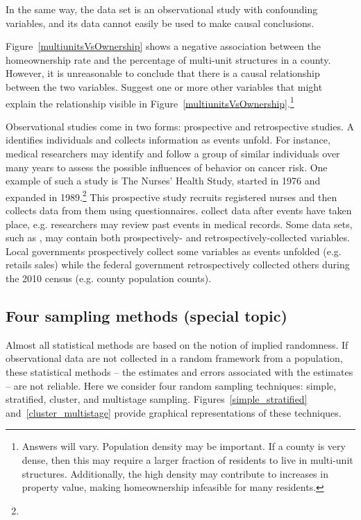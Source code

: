 In the same way, the  data set is an observational study with confounding variables, and its data cannot easily be used to make causal conclusions.

\begin{exercise}
Figure~\ref{multiunitsVsOwnership} shows a negative association between the homeownership rate and the percentage of multi-unit structures in a county. However, it is unreasonable to conclude that there is a causal relationship between the two variables. Suggest one or more other variables that might explain the relationship visible in Figure~\ref{multiunitsVsOwnership}.\footnote{Answers will vary. Population density may be important. If a county is very dense, then this may require a larger fraction of residents to live in multi-unit structures. Additionally, the high density may contribute to increases in property value, making homeownership infeasible for many residents.}
\end{exercise}

Observational studies come in two forms: prospective and retrospective studies. A  identifies individuals and collects information as events unfold. For instance, medical researchers may identify and follow a group of similar individuals over many years to assess the possible influences of behavior on cancer risk. One example of such a study is The Nurses' Health Study, started in 1976 and expanded in 1989.\footnote{} This prospective study recruits registered nurses and then collects data from them using questionnaires.  collect data after events have taken place, e.g. researchers may review past events in medical records. Some data sets, such as , may contain both prospectively- and retrospectively-collected variables. Local governments prospectively collect some variables as events unfolded (e.g. retails sales) while the federal government retrospectively collected others during the 2010 census (e.g. county population counts).

\subsection{Four sampling methods (special topic)}
\label{fourSamplingMethods}
\label{threeSamplingMethods}

Almost all statistical methods are based on the notion of implied randomness. If observational data are not collected in a random framework from a population, these statistical methods -- the estimates and errors associated with the estimates -- are not reliable. Here we consider four random sampling techniques: simple, stratified, cluster, and multistage sampling. Figures~\ref{simple_stratified} and~\ref{cluster_multistage} provide graphical representations of these techniques.

